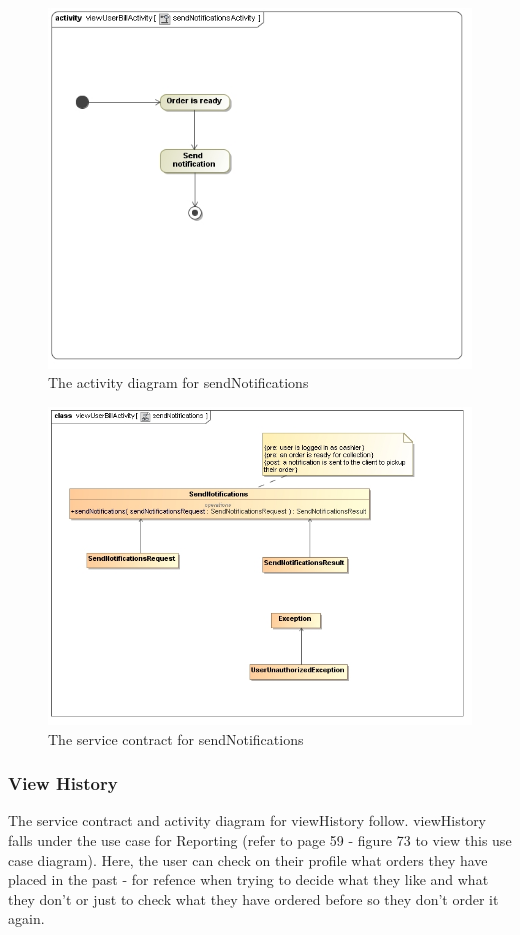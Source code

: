 \documentclass[a4paper,12pt]{report}
\begin{document}
\begin{figure}[H]
  \centering
    \includegraphics[width=1.0\textwidth]{../images/sendNotificationsActivity.jpg}
    \caption{The activity diagram for sendNotifications} 
\end{figure}
\begin{figure}[H]
  \centering
    \includegraphics[width=1.0\textwidth]{../images/sendNotifications.jpg}
    \caption{The service contract for sendNotifications} 
\end{figure}

\subsubsection{View History }
The service contract and activity diagram for viewHistory follow. viewHistory falls under the use case for Reporting (refer to page 59 - figure 73 to view this use case diagram). Here, the user can check on their profile what orders they have placed in the past - for refence when trying to decide what they like and what they don't or just to check what they have ordered before so they don't order it again.
\end{document}
